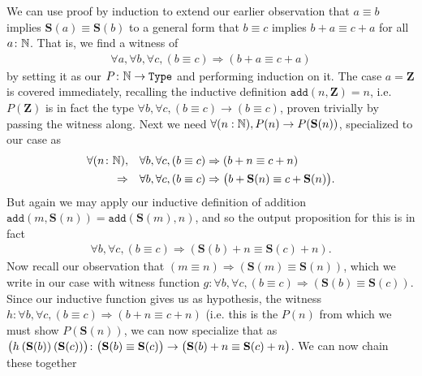 \documentclass[11pt]{article}
\begin{document}
\begin{corollary}
We can use proof by induction to extend our earlier observation that $a \equiv b$ implies $\mathbf{S}(a) \equiv \mathbf{S}(b)$ to a general form that $b \equiv c$ implies $b + a \equiv c + a$ for all $a \colon \mathbb{N}$. That is, we find a witness of \begin{gather*}
\forall a, \forall b, \forall c, (b \equiv c) \Rightarrow (b + a \equiv c + a)
\end{gather*}
by setting it as our $P\colon \mathbb{N} \to \mathtt{Type}$ and performing induction on it. The case $a = \mathbf{Z}$ is covered immediately, recalling the inductive definition $\mathtt{add}(n, \mathbf{Z}) = n$, i.e. $P(\mathbf{Z})$ is in fact the type $\forall b, \forall c, (b \equiv c) \to (b \equiv c)$, proven trivially by passing the witness along. Next we need $\forall (n : \mathbb{N}), P(n) \to P(\mathbf{S}(n))$, specialized to our case as \begin{align*}
\forall (n \colon \mathbb{N}), \hspace{1em} &
\forall b, \forall c, (b \equiv c) \Rightarrow (b + n \equiv c + n) \\
\Rightarrow
\hspace{1em} &
\forall b, \forall c, (b \equiv c) \Rightarrow \big(b + \mathbf{S}(n) \equiv c + \mathbf{S}(n) \big).
\end{align*}
But again we may apply our inductive definition of addition $\mathtt{add}(m, \mathbf{S}(n)) = \mathtt{add}(\mathbf{S}(m),n)$, and so the output proposition for this is in fact \begin{gather*}
\forall b, \forall c, (b \equiv c) \Rightarrow (\mathbf{S}(b) + n \equiv \mathbf{S}(c) + n).
\end{gather*}
Now recall our observation that $(m \equiv n) \Rightarrow (\mathbf{S}(m) \equiv \mathbf{S}(n))$, which we write in our case with witness function $g\colon \forall b, \forall c, (b \equiv c) \Rightarrow (\mathbf{S}(b) \equiv \mathbf{S}(c))$. Since our inductive function gives us as hypothesis, the witness $h \colon \forall b, \forall c, (b \equiv c) \Rightarrow (b + n \equiv c + n) $ (i.e. this is the $P(n)$ from which we must show $P(\mathbf{S}(n))$, we can now specialize that as $\big(h \hspace{0.2em} (\mathbf{S}(b)) \hspace{0.2em} (\mathbf{S}(c)) \big) \colon \big(\mathbf{S}(b) \equiv \mathbf{S}(c) \big) \rightarrow \big(\mathbf{S}(b) + n \equiv \mathbf{S}(c) + n \big)$. We can now chain these together
\begin{gather*}

\end{gather*}
\end{corollary}
\end{document}
